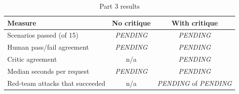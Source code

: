 \begin{table}[!t]
\centering
\caption{Part 3 results}
\label{tab:p3}
\begin{tabular}{lcc}
\hline
Measure & No critique & With critique \\
\hline
Scenarios passed (of 15) & \textit{PENDING} & \textit{PENDING} \\
Human pass/fail agreement & \textit{PENDING} & \textit{PENDING} \\
Critic agreement & n/a & \textit{PENDING} \\
Median seconds per request & \textit{PENDING} & \textit{PENDING} \\
Red-team attacks that succeeded & n/a & \textit{PENDING} of \textit{PENDING} \\
\hline
\end{tabular}
\end{table}

